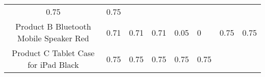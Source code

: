 \documentclass[]{article}
\begin{document}
\begin{longtable}[]{@{}ccllllll@{}}
\begin{minipage}[t]{0.05\columnwidth}
0.75\strut
\end{minipage} & \begin{minipage}[t]{0.05\columnwidth}\raggedright\strut
0.75\strut
\end{minipage}\tabularnewline
\begin{minipage}[t]{0.36\columnwidth}\centering\strut
Product B Bluetooth Mobile Speaker Red\strut
\end{minipage} & \begin{minipage}[t]{0.05\columnwidth}\centering\strut
0.71\strut
\end{minipage} & \begin{minipage}[t]{0.05\columnwidth}\raggedright\strut
0.71\strut
\end{minipage} & \begin{minipage}[t]{0.05\columnwidth}\raggedright\strut
0.71\strut
\end{minipage} & \begin{minipage}[t]{0.05\columnwidth}\raggedright\strut
0.05\strut
\end{minipage} & \begin{minipage}[t]{0.05\columnwidth}\raggedright\strut
0\strut
\end{minipage} & \begin{minipage}[t]{0.05\columnwidth}\raggedright\strut
0.75\strut
\end{minipage} & \begin{minipage}[t]{0.05\columnwidth}\raggedright\strut
0.75\strut
\end{minipage}\tabularnewline
\begin{minipage}[t]{0.36\columnwidth}\centering\strut
Product C Tablet Case for iPad Black\strut
\end{minipage} & \begin{minipage}[t]{0.05\columnwidth}\centering\strut
0.75\strut
\end{minipage} & \begin{minipage}[t]{0.05\columnwidth}\raggedright\strut
0.75\strut
\end{minipage} & \begin{minipage}[t]{0.05\columnwidth}\raggedright\strut
0.75\strut
\end{minipage} & \begin{minipage}[t]{0.05\columnwidth}\raggedright\strut
0.75\strut
\end{minipage} & \begin{minipage}[t]{0.05\columnwidth}\raggedright\strut
0.75\strut
\end{minipage} & \begin{minipage}[t]{0.05\columnwidth}\raggedright\strut

\end{minipage}
\end{longtable}
\end{document}
